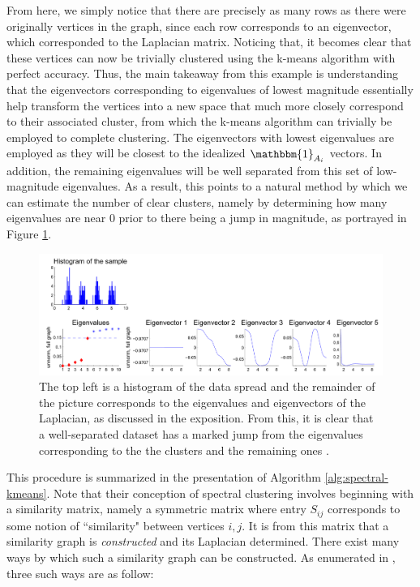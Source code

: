 \documentclass{article}
\begin{document}
From here, we simply notice that there are precisely as many rows as there were originally vertices in the graph, since each row corresponds to an eigenvector, which corresponded to the Laplacian matrix. Noticing that, it becomes clear that these vertices can now be trivially clustered using the k-means algorithm with perfect accuracy. Thus, the main takeaway from this example is understanding that the eigenvectors corresponding to eigenvalues of lowest magnitude essentially help transform the vertices into a new space that much more closely correspond to their associated cluster, from which the k-means algorithm can trivially be employed to complete clustering. The eigenvectors with lowest eigenvalues are employed as they will be closest to the idealized $\mathbbm{1}_{A_i}$ vectors. In addition, the remaining eigenvalues will be well separated from this set of low-magnitude eigenvalues. As a result, this points to a natural method by which we can estimate the number of clear clusters, namely by determining how many eigenvalues are near 0 prior to there being a jump in magnitude, as portrayed in Figure \ref{fig:spectral_example}.

\begin{figure}
    \label{fig:spectral_example}
    \centering
    \includegraphics[width=.95\textwidth]{spectral_example.png}
    \caption[Spectral Eigenvector]{The top left is a histogram of the data spread and the remainder of the picture corresponds to the eigenvalues and eigenvectors of the Laplacian, as discussed in the exposition. From this, it is clear that a well-separated dataset has a marked jump from the eigenvalues corresponding to the the clusters and the remaining ones \cite{spectral}.}
\end{figure}

This procedure is summarized in the presentation of Algorithm \ref{alg:spectral-kmeans}. Note that their conception of spectral clustering involves beginning with a similarity matrix, namely a symmetric matrix where entry $S_{ij}$ corresponds to some notion of ``similarity" between vertices $i,j$. It is from this matrix that a similarity graph is \textit{constructed} and its Laplacian determined. There exist many ways by which such a similarity graph can be constructed. As enumerated in \cite{spectral}, three such ways are as follow:
\end{document}
